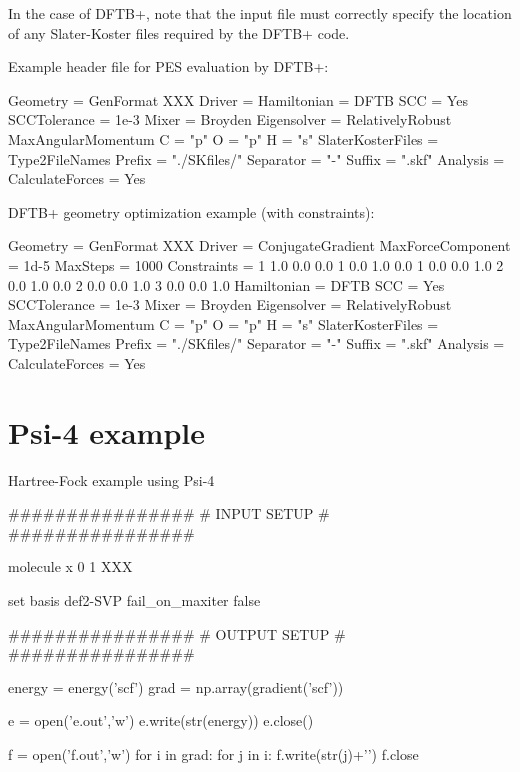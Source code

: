 In the case of D\+F\+T\+B+, note that the input file must correctly specify the location of any Slater-\/\+Koster files required by the D\+F\+T\+B+ code.


\begin{DoxyItemize}
\item Example header file for P\+ES evaluation by D\+F\+T\+B+\+:
\end{DoxyItemize}

\begin{DoxyVerb}     Geometry = GenFormat {
    XXX
    }
    Driver = {}
     Hamiltonian = DFTB {
     SCC = Yes
     SCCTolerance = 1e-3
     Mixer = Broyden{}
     Eigensolver = RelativelyRobust {}
    MaxAngularMomentum {
     C = "p"
    O = "p"
    H = "s"
     }
    SlaterKosterFiles = Type2FileNames {
    Prefix = "./SKfiles/"
     Separator = "-"
     Suffix = ".skf"
     }
    }
    Analysis = {
    CalculateForces = Yes
     }
\end{DoxyVerb}



\begin{DoxyItemize}
\item D\+F\+T\+B+ geometry optimization example (with constraints)\+:
\end{DoxyItemize}

\begin{DoxyVerb}Geometry = GenFormat {
XXX
}
 Driver = ConjugateGradient{
 MaxForceComponent = 1d-5
 MaxSteps = 1000
 Constraints = {
 1 1.0 0.0 0.0
 1 0.0 1.0 0.0
 1 0.0 0.0 1.0
 2 0.0 1.0 0.0
 2 0.0 0.0 1.0
 3 0.0 0.0 1.0
 }
 }
 Hamiltonian = DFTB {
SCC = Yes
 SCCTolerance = 1e-3
 Mixer = Broyden{}
 Eigensolver = RelativelyRobust {}
MaxAngularMomentum {
 C = "p"
O = "p"
 H = "s"
 }
 SlaterKosterFiles = Type2FileNames {
 Prefix = "./SKfiles/"
 Separator = "-"
 Suffix = ".skf"
 }
 }
 Analysis = {
 CalculateForces = Yes
 }
\end{DoxyVerb}


\section*{Psi-\/4 example}


\begin{DoxyItemize}
\item Hartree-\/\+Fock example using Psi-\/4
\end{DoxyItemize}

\begin{DoxyVerb}################
# INPUT SETUP #
################

molecule x {
0 1
XXX
}

set {
    basis def2-SVP
    fail_on_maxiter false
}


################
# OUTPUT SETUP #
################

energy = energy('scf')
grad = np.array(gradient('scf'))

e = open('e.out','w')
e.write(str(energy))
e.close()

f = open('f.out','w')
for i in grad:
    for j in i:
        f.write(str(j)+'\n')
f.close\end{DoxyVerb}
 